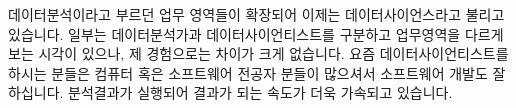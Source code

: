 \documentclass[letterpaper,10pt,english]{jupyterBook}
\begin{document}
\sphinxAtStartPar
데이터분석이라고 부르던 업무 영역들이 확장되어 이제는 데이터사이언스라고 불리고 있습니다. 일부는 데이터분석가과 데이터사이언티스트를 구분하고 업무영역을 다르게 보는 시각이 있으나, 제 경험으로는 차이가 크게 없습니다. 요즘 데이터사이언티스트를 하시는 분들은 컴퓨터 혹은 소프트웨어 전공자 분들이 많으셔서 소프트웨어 개발도 잘 하십니다. 분석결과가 실행되어 결과가 되는 속도가 더욱 가속되고 있습니다.







\renewcommand{\indexname}{Index}
\printindex
\end{document}
